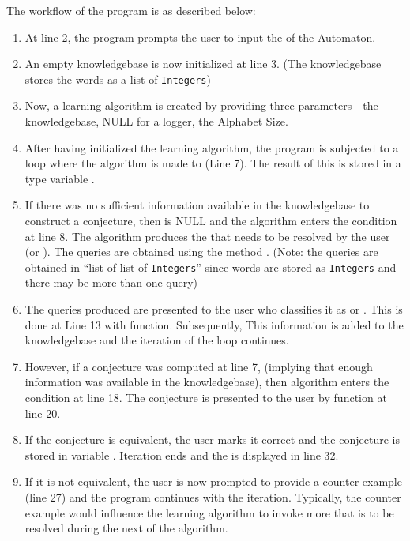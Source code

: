 The workflow of the program is as described below:

\begin{enumerate}
	\item At line 2, the program prompts the user to input the \alphsize of the Automaton.
	\item An empty knowledgebase is now initialized at line 3. (The knowledgebase stores the words as a list of \texttt{Integers})
	\item Now, a learning algorithm is created by providing three parameters - the knowledgebase, NULL for a logger, the Alphabet Size.
	\item After having initialized the learning algorithm, the program is subjected to a loop where the algorithm is made to \advanced (Line 7). The result of this is stored in a \conjecture type variable \cj.
	
	\item If there was no sufficient information available in the knowledgebase to construct a conjecture, then \cj is NULL and the algorithm enters the condition at line 8. The algorithm produces the \memque that needs to be resolved by the user (or \teacher). The queries are obtained using the method \getqueries. (Note: the queries are obtained in ``list of list of \texttt{Integers}'' since words are stored as \texttt{Integers} and there may be more than one query)
	
	\item The queries produced are presented to the user who classifies it as \accepted or \rejected. This is done at Line 13 with \answer function. Subsequently, This information is added to the knowledgebase and the iteration of the loop continues.

	\item However, if a conjecture was computed at line 7, (implying that enough information was available in the knowledgebase), then algorithm enters the condition at line 18. The conjecture is presented to the user by \checkeq function at line 20.
	
	\item If the conjecture is equivalent, the user marks it correct and the conjecture is stored in variable \result. Iteration ends and the \result is displayed in line 32.
	
	\item If it is not equivalent, the user is now prompted to provide a counter example (line 27) and the program continues with the iteration. Typically, the counter example would influence the learning algorithm to invoke more \memque that is to be resolved during the next \advanced of the algorithm.
\end{enumerate}

